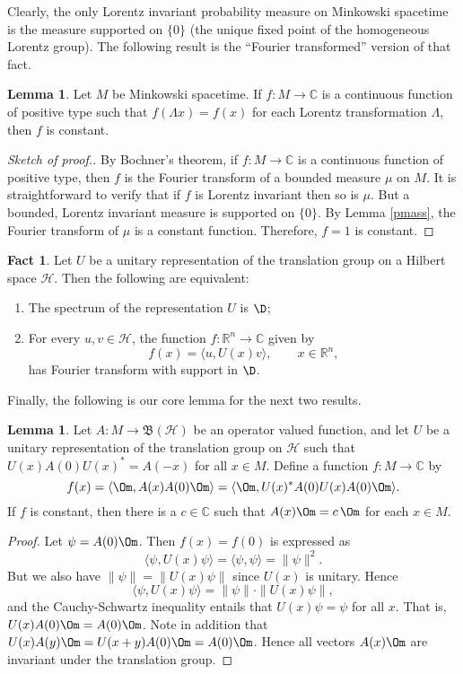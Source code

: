 \documentclass[11pt]{article}
\newcommand{\norm}[1]{\| #1\|}
\newcommand{\bh}{\mathfrak{B}(\mathcal{H})}
\theoremstyle{definition}
\newtheorem{fact}[thm]{Fact}
\newtheorem{lemma}[thm]{Lemma}
\theoremstyle{definition}
\theoremstyle{remark}
\def\2#1{{\mathcal #1}}
\def\7#1{{\mathbb #1}}
\begin{document}
Clearly, the only Lorentz invariant probability measure on Minkowski
spacetime is the measure supported on $\{ 0\}$ (the unique fixed point
of the homogeneous Lorentz group).  The following result is the
``Fourier transformed'' version of that fact.

\begin{lemma} Let $M$ be Minkowski spacetime.  If $f:M\to \7C$ is a continuous
  function of positive type such that $f(\Lambda x)=f(x)$ for each Lorentz
  transformation $\Lambda$, then $f$ is constant. \label{constant}
\end{lemma}

\begin{proof}[Sketch of proof.] By Bochner's theorem, if $f:M\to \7C$ is a continuous
  function of positive type, then $f$ is the Fourier transform of a bounded measure
  $\mu$ on $M$.  It is straightforward to verify that if $f$ is Lorentz invariant
  then so is $\mu$.  But a bounded, Lorentz invariant measure is supported on $\{
  0\}$.  By Lemma \ref{pmass}, the Fourier transform of $\mu$ is a constant function.
  Therefore, $f=1$ is constant.
\end{proof}

\begin{fact} Let $U$ be a unitary representation of the translation group on a
  Hilbert space $\2H$.  Then the following are equivalent:
\begin{enumerate}
\item The spectrum of the representation $U$ is $\D$;
\item For every $u,v\in \2H$, the function $f:\7R ^n\to \7C$ given by
$$ f(x)=\langle u,U(x)v\rangle ,\qquad x\in \7R ^n ,$$
has Fourier transform with support in $\D$.
\end{enumerate}
\end{fact}

Finally, the following is our core lemma for the next two results.

\begin{lemma} Let $A:M\to \bh$ be an operator valued function, and let $U$ be a
  unitary representation of the translation group on $\2H$ such that
  $U(x)A(0)U(x)^*=A(-x)$ for all $x\in M$.  Define a function $f:M\to \7C$ by
$$ f(x)=\langle \Om ,A(x)A(0)\Om \rangle =\langle \Om ,U(x)^*A(0)U(x)A(0)\Om \rangle .$$
If $f$ is constant, then there is a $c\in \7C$ such that $A(x)\Om =c\,\Om$ for each
$x\in M$.  \label{two-point} \end{lemma}

\begin{proof} Let $\psi =A(0)\Om$.  Then $f(x)=f(0)$ is expressed as
$$\langle \psi ,U(x)\psi \rangle = \langle \psi ,\psi \rangle =\norm{\psi}^2 . $$
But we also have $\norm{\psi }=\norm{U(x)\psi}$ since $U(x)$ is unitary.  Hence
$$ \langle \psi ,U(x)\psi \rangle =\norm{\psi}\cdot \norm{U(x)\psi } ,$$
and the Cauchy-Schwartz inequality entails that $U(x)\psi =\psi$ for all $x$.  That
is, $U(x)A(0)\Om =A(0)\Om$.  Note in addition that $U(x)A(y)\Om = U(x+y)A(0)\Om
=A(0)\Om$.  Hence all vectors $A(x)\Om$ are invariant under the translation group.
\end{proof}
\end{document}
